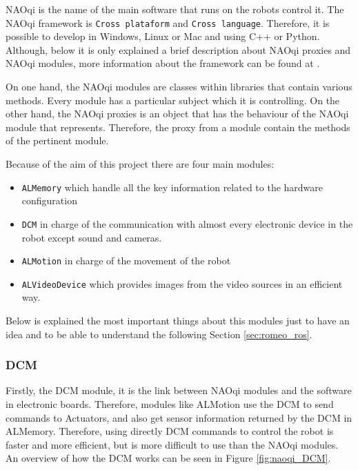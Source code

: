 \documentclass[12pt,a4paper,final,twoside,openright]{report}
\begin{document}
NAOqi is the name of the main software that runs on the robots control it. The NAOqi framework is \texttt{Cross plataform} and \texttt{Cross language}. Therefore, it is possible to develop in Windows, Linux or Mac and using C++ or Python. Although, below it is only explained a brief description about NAOqi proxies and NAOqi modules, more information about the framework can be found at \citep{Aldebaran}. 

On one hand, the NAOqi modules are classes within libraries that contain various methods. Every module has a particular subject which it is controlling. On the other hand, the NAOqi proxies is an object that has the behaviour of the NAOqi module that represents. Therefore, the proxy from a module contain the methods of the pertinent module.

Because of the aim of this project there are four main modules:

\begin{itemize}
\item \texttt{ALMemory} which handle all the key information related to the hardware configuration
\item \texttt{DCM} in charge of the communication with almost every electronic device in the robot except sound and cameras.
\item \texttt{ALMotion} in charge of the movement of the robot
\item \texttt{ALVideoDevice} which provides images from the video sources in an efficient way.
\end{itemize} 

Below is explained the most important things about this modules just to have an idea and to be able to understand the following Section \ref{sec:romeo_ros}.

\subsubsection{DCM}

Firstly, the DCM module, it is the link between NAOqi modules and the software in electronic boards. Therefore, modules like ALMotion use the DCM to send commands to Actuators, and also get sensor information returned by the DCM in ALMemory. Therefore, using directly DCM commands to control the robot is faster and more efficient, but is more difficult to use than the NAOqi modules. An overview of how the DCM works can be seen in Figure \ref{fig:naoqi_DCM}.
\end{document}
